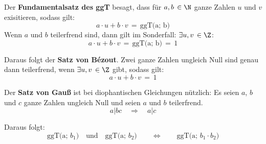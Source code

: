 \documentclass[main.tex]{subfiles}
\begin{document}
\begin{Definition}
	Der \textbf{Fundamentalsatz des ggT} besagt, dass für $a,b \, \in \N$ ganze Zahlen $u$ und $v$ exisitieren, sodass gilt:
	$$a\cdot u + b\cdot v \,=\, \text{ggT(a; b)} $$
	Wenn $a$ und $b$ teilerfrend sind, dann gilt im Sonderfall: $\exists u, v \, \in \Z$:
	$$a\cdot u + b\cdot v \,=\, \text{ggT(a; b)} \,=\, 1 $$
	
	Daraus folgt der \textbf{Satz von Bézout}. Zwei ganze Zahlen ungleich Null sind genau dann teilerfrend, wenn $\exists u, v \, \in \Z$ gibt, sodass gilt:
	$$a\cdot u + b\cdot v \,=\, 1 $$
	
	Der \textbf{Satz von Gauß} ist bei diophantischen Gleichungen nützlich: Es seien $a$, $b$ und $c$ ganze Zahlen ungleich Null und seien $a$ und $b$ teilerfrend.
	$$a | bc \quad \Rightarrow \quad a | c$$
	
	Daraus folgt:
	$$\text{ggT(a; $b_{1}$)} \quad \text{und} \quad \text{ggT(a; $b_{2}$)} \qquad \Leftrightarrow \qquad \text{ggT(a; $b_{1}\cdot b_{2}$)}$$
\end{Definition}
\end{document}
